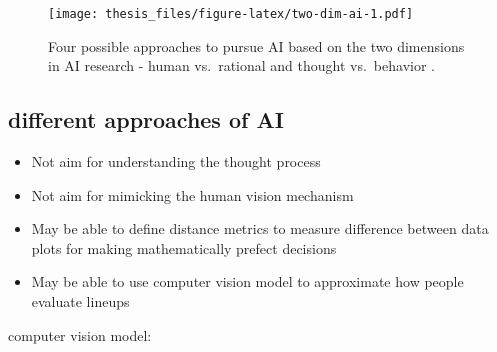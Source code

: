 \documentclass{monashthesis}
\theoremstyle{definition}
\theoremstyle{definition}
\theoremstyle{definition}
\theoremstyle{definition}
\theoremstyle{remark}
\begin{document}
\begin{figure}
\centering
\texttt{[image: thesis\_files/figure-latex/two-dim-ai-1.pdf]}
\caption{\label{fig:two-dim-ai}Four possible approaches to pursue AI based on the two dimensions in AI research - human vs.~rational and thought vs.~behavior \autocite{russell_artificial_2002}.}
\end{figure}

\hypertarget{different-approaches-of-ai}{%
\subsection{different approaches of AI}\label{different-approaches-of-ai}}

\begin{itemize}
\tightlist
\item
  Not aim for understanding the thought process
\item
  Not aim for mimicking the human vision mechanism
\item
  May be able to define distance metrics to measure difference between data plots for making mathematically prefect decisions
\item
  May be able to use computer vision model to approximate how people evaluate lineups
\end{itemize}

computer vision model:
\end{document}
